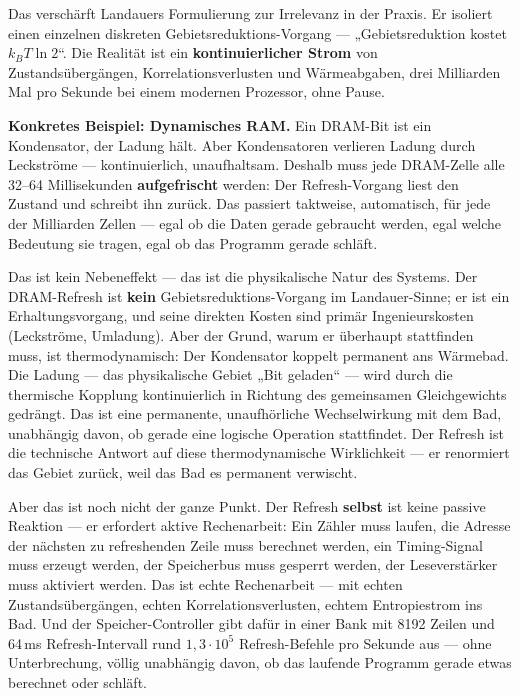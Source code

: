 \documentclass[11pt,a4paper]{article}
\begin{document}
Das verschärft Landauers Formulierung zur Irrelevanz in der Praxis. Er isoliert
einen einzelnen diskreten Gebietsreduktions-Vorgang --- „Gebietsreduktion kostet
$k_B T \ln 2$“. Die Realität ist ein \textbf{kontinuierlicher Strom} von
Zustandsübergängen, Korrelationsverlusten und Wärmeabgaben, drei Milliarden Mal
pro Sekunde bei einem modernen Prozessor, ohne Pause.

\textbf{Konkretes Beispiel: Dynamisches RAM.} Ein DRAM-Bit ist ein Kondensator,
der Ladung hält. Aber Kondensatoren verlieren Ladung durch Leckströme ---
kontinuierlich, unaufhaltsam. Deshalb muss jede DRAM-Zelle alle 32--64
Millisekunden \textbf{aufgefrischt} werden: Der Refresh-Vorgang liest den Zustand
und schreibt ihn zurück. Das passiert taktweise, automatisch, für jede der
Milliarden Zellen --- egal ob die Daten gerade gebraucht werden, egal welche
Bedeutung sie tragen, egal ob das Programm gerade schläft.

Das ist kein Nebeneffekt --- das ist die physikalische Natur des Systems. Der
DRAM-Refresh ist \textbf{kein} Gebietsreduktions-Vorgang im Landauer-Sinne; er ist
ein Erhaltungsvorgang, und seine direkten Kosten sind primär Ingenieurskosten
(Leckströme, Umladung). Aber der Grund, warum er überhaupt stattfinden muss, ist
thermodynamisch: Der Kondensator koppelt permanent ans Wärmebad. Die Ladung ---
das physikalische Gebiet „Bit geladen“ --- wird durch die thermische Kopplung
kontinuierlich in Richtung des gemeinsamen Gleichgewichts gedrängt. Das ist eine
permanente, unaufhörliche Wechselwirkung mit dem Bad, unabhängig davon, ob gerade
eine logische Operation stattfindet. Der Refresh ist die technische Antwort auf
diese thermodynamische Wirklichkeit --- er renormiert das Gebiet zurück, weil das
Bad es permanent verwischt.

Aber das ist noch nicht der ganze Punkt. Der Refresh \textbf{selbst} ist keine
passive Reaktion --- er erfordert aktive Rechenarbeit: Ein Zähler muss laufen, die
Adresse der nächsten zu refreshenden Zeile muss berechnet werden, ein
Timing-Signal muss erzeugt werden, der Speicherbus muss gesperrt werden, der
Leseverstärker muss aktiviert werden. Das ist echte Rechenarbeit --- mit echten
Zustandsübergängen, echten Korrelationsverlusten, echtem Entropiestrom ins Bad.
Und der Speicher-Controller gibt dafür in einer Bank mit 8192 Zeilen und 64\,ms
Refresh-Intervall rund $1{,}3\cdot10^{5}$ Refresh-Befehle pro Sekunde aus --- ohne
Unterbrechung, völlig unabhängig davon, ob das laufende Programm gerade etwas
berechnet oder schläft.
\end{document}
